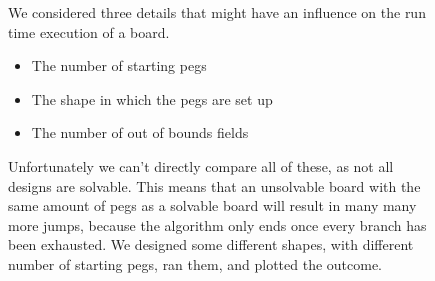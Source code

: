 \documentclass[11pt]{article}
\begin{document}
\begin{figure}
We considered three details that might have an influence on the run time execution of a board.
\begin{itemize}
\item The number of starting pegs
\item The shape in which the pegs are set up
\item The number of out of bounds fields
\end{itemize}
Unfortunately we can't directly compare all of these, as not all designs are solvable. This means that an unsolvable board with the same amount of pegs as a solvable board will result in many many more jumps, because the algorithm only ends once every branch has been exhausted.\newline
We designed some different shapes, with different number of starting pegs, ran them, and plotted the outcome.\\
\end{figure}
\newpage
\end{document}
